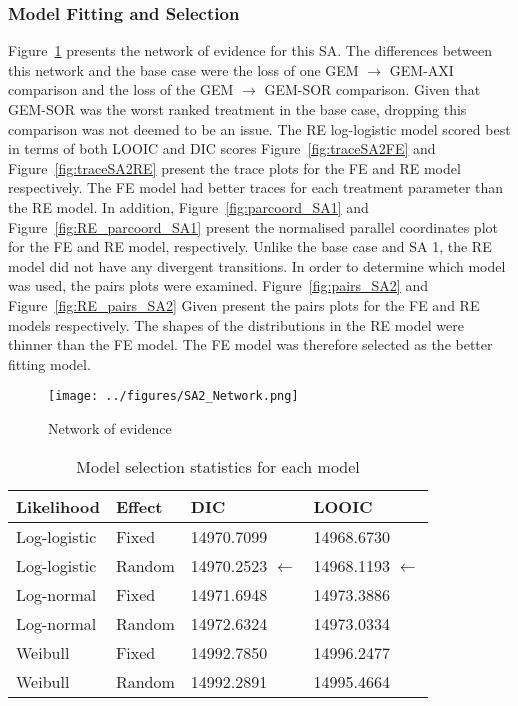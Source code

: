 \subsubsection{Model Fitting and Selection}
Figure~\ref{fig:sa2net} presents the network of evidence for this SA. The differences between this network and the base case were the loss of one GEM $\rightarrow$ GEM-AXI comparison and the loss of the GEM $\rightarrow$ GEM-SOR comparison. Given that GEM-SOR was the worst ranked treatment in the base case, dropping this comparison was not deemed to be an issue. The RE log-logistic model scored best in terms of both LOOIC and DIC scores Figure~\ref{fig:traceSA2FE} and Figure~\ref{fig:traceSA2RE} present the trace plots for the FE and RE model respectively. The FE model had better traces for each treatment parameter than the RE model. In addition, Figure~\ref{fig:parcoord_SA1} and Figure~\ref{fig:RE_parcoord_SA1} present the normalised parallel coordinates plot for the FE and RE model, respectively. Unlike the base case and SA 1, the RE model did not have any divergent transitions. In order to determine which model was used, the pairs plots were examined. Figure~\ref{fig:pairs_SA2} and Figure~\ref{fig:RE_pairs_SA2} Given present the pairs plots for the FE and RE models respectively. The shapes of the distributions in the RE model were thinner than the FE model. The FE model was therefore selected as the better fitting model. \\

\begin{figure}[h]
    \centering
    \texttt{[image: ../figures/SA2\_Network.png]}
    \caption{Network of evidence}
    \label{fig:sa2net}
\end{figure}

\begin{table}[h]
    \centering
    \begin{tabular}{llll}
    \hline
    Likelihood   & Effect & DIC        & LOOIC      \\ \hline
    Log-logistic & Fixed  & 14970.7099 & 14968.6730 \\
    Log-logistic & Random & 14970.2523 $\leftarrow$ & 14968.1193 $\leftarrow$ \\
    Log-normal   & Fixed  & 14971.6948 & 14973.3886 \\
    Log-normal   & Random & 14972.6324 & 14973.0334 \\
    Weibull      & Fixed  & 14992.7850 & 14996.2477 \\
    Weibull      & Random & 14992.2891 & 14995.4664 \\ \hline
    \end{tabular}
    \caption{Model selection statistics for each model}
    \label{selectStatSA2}
\end{table}

